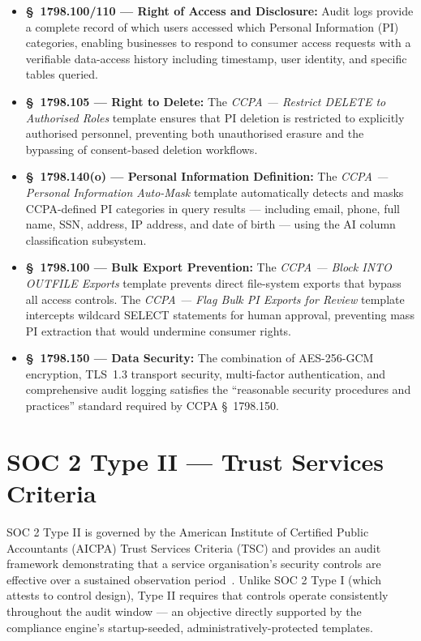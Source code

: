 \begin{itemize}
    \item \textbf{\S~1798.100/110 --- Right of Access and Disclosure:} Audit logs provide a complete record of which users accessed which Personal Information (PI) categories, enabling businesses to respond to consumer access requests with a verifiable data-access history including timestamp, user identity, and specific tables queried.
    \item \textbf{\S~1798.105 --- Right to Delete:} The \textit{CCPA --- Restrict DELETE to Authorised Roles} template ensures that PI deletion is restricted to explicitly authorised personnel, preventing both unauthorised erasure and the bypassing of consent-based deletion workflows.
    \item \textbf{\S~1798.140(o) --- Personal Information Definition:} The \textit{CCPA --- Personal Information Auto-Mask} template automatically detects and masks CCPA-defined PI categories in query results --- including email, phone, full name, SSN, address, IP address, and date of birth --- using the AI column classification subsystem.
    \item \textbf{\S~1798.100 --- Bulk Export Prevention:} The \textit{CCPA --- Block INTO OUTFILE Exports} template prevents direct file-system exports that bypass all access controls. The \textit{CCPA --- Flag Bulk PI Exports for Review} template intercepts wildcard SELECT statements for human approval, preventing mass PI extraction that would undermine consumer rights.
    \item \textbf{\S~1798.150 --- Data Security:} The combination of AES-256-GCM encryption, TLS~1.3 transport security, multi-factor authentication, and comprehensive audit logging satisfies the ``reasonable security procedures and practices'' standard required by CCPA \S~1798.150.
\end{itemize}

\section{SOC 2 Type II --- Trust Services Criteria}

SOC 2 Type II is governed by the American Institute of Certified Public Accountants (AICPA) Trust Services Criteria (TSC) and provides an audit framework demonstrating that a service organisation's security controls are effective over a sustained observation period~\cite{soc2-2022}. Unlike SOC 2 Type I (which attests to control design), Type II requires that controls operate consistently throughout the audit window --- an objective directly supported by the compliance engine's startup-seeded, administratively-protected templates.


